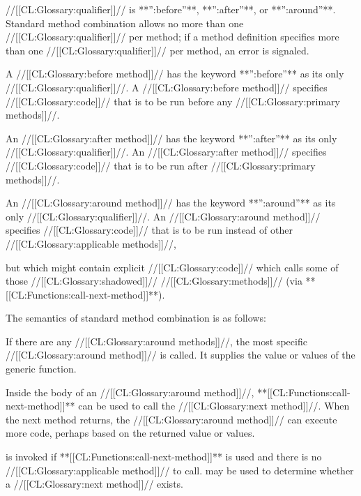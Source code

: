 //[[CL:Glossary:qualifier]]// is **'':before''**, **'':after''**, or **'':around''**. Standard method combination allows no more than one //[[CL:Glossary:qualifier]]// per method; if a method definition specifies more than one //[[CL:Glossary:qualifier]]// per method, an error is signaled.

\beginlist

\itemitem{\bull} A //[[CL:Glossary:before method]]// has the keyword **'':before''** as its only //[[CL:Glossary:qualifier]]//. A //[[CL:Glossary:before method]]// specifies //[[CL:Glossary:code]]// that is to be run before any  //[[CL:Glossary:primary methods]]//.

\itemitem{\bull} An //[[CL:Glossary:after method]]// has the keyword **'':after''** as its only //[[CL:Glossary:qualifier]]//. An //[[CL:Glossary:after method]]// specifies //[[CL:Glossary:code]]// that is to be run after //[[CL:Glossary:primary methods]]//.

\itemitem{\bull} An //[[CL:Glossary:around method]]// has the keyword **'':around''** as its only //[[CL:Glossary:qualifier]]//. An //[[CL:Glossary:around method]]// specifies //[[CL:Glossary:code]]// that is to be run instead of other //[[CL:Glossary:applicable methods]]//,

but which might contain explicit //[[CL:Glossary:code]]// which calls some of those //[[CL:Glossary:shadowed]]// //[[CL:Glossary:methods]]// (via **[[CL:Functions:call-next-method]]**).

\endlist

The semantics of standard method combination is as follows:

\beginlist
                                \itemitem{\bull} If there are any //[[CL:Glossary:around methods]]//, the most specific //[[CL:Glossary:around method]]// is called.  It supplies the value or values of the generic function.

\itemitem{\bull} Inside the body of an //[[CL:Glossary:around method]]//,  **[[CL:Functions:call-next-method]]** can be used to call the //[[CL:Glossary:next method]]//.  When the next method returns, the //[[CL:Glossary:around method]]// can execute more code, perhaps based on the returned value or values.

 is invoked if **[[CL:Functions:call-next-method]]** is used and there is no //[[CL:Glossary:applicable method]]// to call.   may be used to determine whether a //[[CL:Glossary:next method]]// exists.

